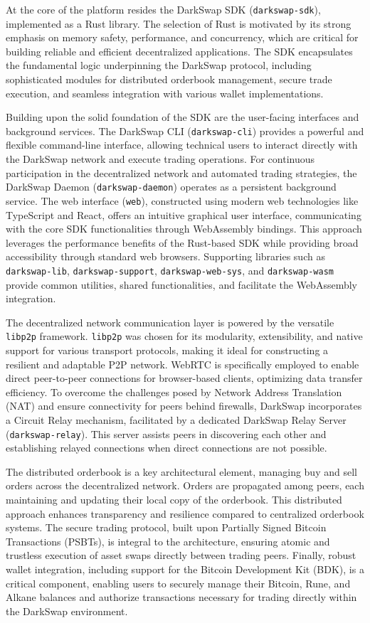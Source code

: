 \documentclass{article}
\begin{document}
At the core of the platform resides the DarkSwap SDK (\texttt{darkswap-sdk}), implemented as a Rust library. The selection of Rust is motivated by its strong emphasis on memory safety, performance, and concurrency, which are critical for building reliable and efficient decentralized applications. The SDK encapsulates the fundamental logic underpinning the DarkSwap protocol, including sophisticated modules for distributed orderbook management, secure trade execution, and seamless integration with various wallet implementations.

Building upon the solid foundation of the SDK are the user-facing interfaces and background services. The DarkSwap CLI (\texttt{darkswap-cli}) provides a powerful and flexible command-line interface, allowing technical users to interact directly with the DarkSwap network and execute trading operations. For continuous participation in the decentralized network and automated trading strategies, the DarkSwap Daemon (\texttt{darkswap-daemon}) operates as a persistent background service. The web interface (\texttt{web}), constructed using modern web technologies like TypeScript and React, offers an intuitive graphical user interface, communicating with the core SDK functionalities through WebAssembly bindings. This approach leverages the performance benefits of the Rust-based SDK while providing broad accessibility through standard web browsers. Supporting libraries such as \texttt{darkswap-lib}, \texttt{darkswap-support}, \texttt{darkswap-web-sys}, and \texttt{darkswap-wasm} provide common utilities, shared functionalities, and facilitate the WebAssembly integration.

The decentralized network communication layer is powered by the versatile \texttt{libp2p} framework. \texttt{libp2p} was chosen for its modularity, extensibility, and native support for various transport protocols, making it ideal for constructing a resilient and adaptable P2P network. WebRTC is specifically employed to enable direct peer-to-peer connections for browser-based clients, optimizing data transfer efficiency. To overcome the challenges posed by Network Address Translation (NAT) and ensure connectivity for peers behind firewalls, DarkSwap incorporates a Circuit Relay mechanism, facilitated by a dedicated DarkSwap Relay Server (\texttt{darkswap-relay}). This server assists peers in discovering each other and establishing relayed connections when direct connections are not possible.

The distributed orderbook is a key architectural element, managing buy and sell orders across the decentralized network. Orders are propagated among peers, each maintaining and updating their local copy of the orderbook. This distributed approach enhances transparency and resilience compared to centralized orderbook systems. The secure trading protocol, built upon Partially Signed Bitcoin Transactions (PSBTs), is integral to the architecture, ensuring atomic and trustless execution of asset swaps directly between trading peers. Finally, robust wallet integration, including support for the Bitcoin Development Kit (BDK), is a critical component, enabling users to securely manage their Bitcoin, Rune, and Alkane balances and authorize transactions necessary for trading directly within the DarkSwap environment.
\end{document}

